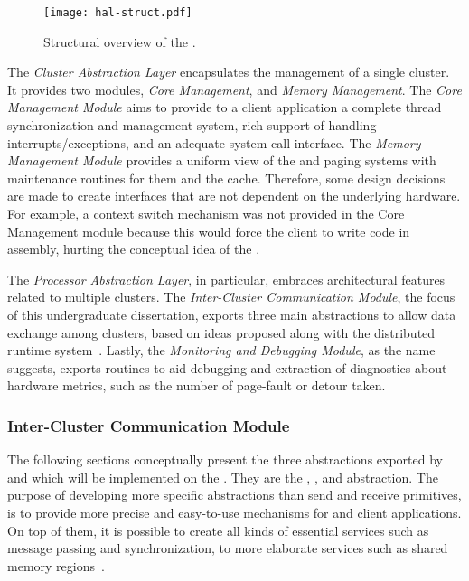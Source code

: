 		\begin{figure}[t]
			\centering%
			\caption{Structural overview of the \hal.}%
			\label{fig:hal-struct}%
			\texttt{[image: hal-struct.pdf]}%
		\end{figure}

		The \textit{Cluster Abstraction Layer} encapsulates the management of a single cluster.
		It provides two modules, \textit{Core Management}, and \textit{Memory Management}.
		The \textit{Core Management Module} aims to provide to a client application a complete
		thread synchronization and management system, rich support of handling
		interrupts/exceptions, and an adequate system call interface.
		The \textit{Memory Management Module} provides a uniform view of the \tlbs
		and paging systems with maintenance routines for them and the cache.
		Therefore, some design decisions are made to create interfaces that are not
		dependent on the underlying hardware.
		For example, a context switch mechanism was not provided in the
		Core Management module because this would force the client \os
		to write code in assembly, hurting the conceptual idea of the \hal.

		The \textit{Processor Abstraction Layer}, in particular, embraces
		architectural features related to multiple clusters.
		The \textit{Inter-Cluster Communication Module}, the focus of
		this undergraduate dissertation, exports three main abstractions
		to allow data exchange among clusters, based on ideas proposed
		along with the \nodeos distributed runtime system~\cite{DeDinechin2013-1}.
		Lastly, the \textit{Monitoring and Debugging Module}, as the
		name suggests, exports routines to aid debugging and extraction
		of diagnostics about hardware metrics, such as the number of
		page-fault or detour taken.

		\subsubsection{Inter-Cluster Communication Module}
		\label{sec.inter-cluster-communication}

			The following sections conceptually present the three abstractions
			exported by \hal and which will be implemented on the \mppa.
			They are the \sync, \mailbox, and \portal abstraction.
			The purpose of developing more specific abstractions than
			send and receive primitives, is to provide more precise and easy-to-use
			mechanisms for \os and client applications.
			On top of them, it is possible to create all kinds of essential
			services such as message passing and synchronization,
			to more elaborate services such as shared memory regions~\cite{penna:rmen}.

